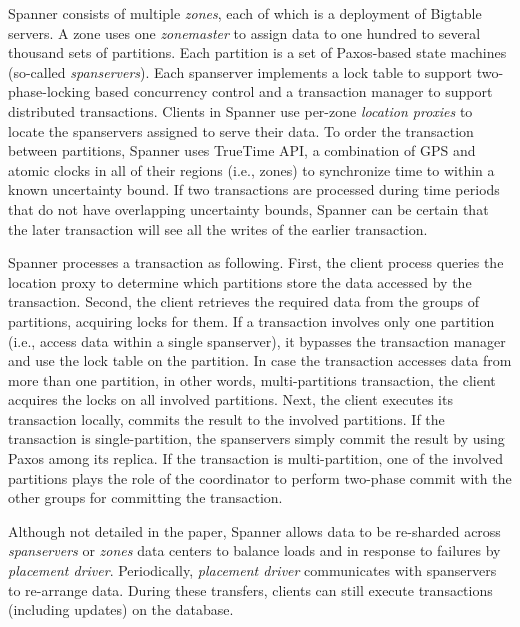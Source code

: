Spanner consists of multiple \emph{zones}, each of which is a deployment of
Bigtable servers. A zone uses one \emph{zonemaster} to assign data to one
hundred to several thousand sets of partitions. Each partition is a set of
Paxos-based state machines (so-called \emph{spanservers}). Each spanserver
implements a lock table to support two-phase-locking based concurrency control
and a transaction manager to support distributed transactions. Clients in
Spanner use per-zone \emph{location proxies} to locate the spanservers assigned
to serve their data. To order the transaction between partitions, Spanner uses
TrueTime API, a combination of GPS and atomic clocks in all of their regions
(i.e., zones) to synchronize time to within a known uncertainty bound. If two
transactions are processed during time periods that do not have overlapping
uncertainty bounds, Spanner can be certain that the later transaction will see
all the writes of the earlier transaction.

Spanner processes a transaction as following. First, the client process queries
the location proxy to determine which partitions store the data accessed by the
transaction. Second, the client retrieves the required data from the groups of
partitions, acquiring locks for them. If a transaction involves only one
partition (i.e., access data within a single spanserver), it bypasses the
transaction manager and use the lock table on the partition. In case the
transaction accesses data from more than one partition, in other words,
multi-partitions transaction, the client acquires the locks on all involved
partitions. Next, the client executes its transaction locally, commits the
result to the involved partitions. If the transaction is single-partition, the
spanservers simply commit the result by using Paxos among its replica. If the
transaction is multi-partition, one of the involved partitions plays the role
of the coordinator to perform two-phase commit with the other groups for
committing the transaction.


Although not detailed in the paper, Spanner allows data to be re-sharded across
\emph{spanservers} or \emph{zones} data centers to balance loads and in response
to failures by \emph{placement driver}. Periodically, \emph{placement driver}
communicates with spanservers to re-arrange data. During these transfers,
clients can still execute transactions (including updates) on the database.


